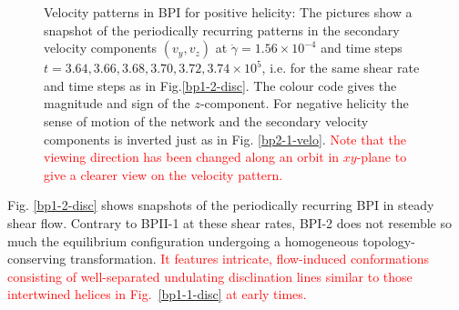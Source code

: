 \documentclass[8.5pt,twoside,twocolumn]{article}
\newcommand{\e}[1]{\times10^{#1}}
\newcommand{\gd}{\dot{\gamma}}
\newcommand{\rev}[1]{{\textcolor{red}{#1}}}
\begin{document}
\begin{figure}[htpb]
\caption{Velocity patterns in BPI for positive helicity: 
The pictures show a snapshot of the periodically recurring patterns in the 
secondary velocity components $(v_y,v_z)$ at $\gd=1.56\e{-4}$ and time steps 
$t=3.64, 3.66,3.68,3.70,3.72,3.74\e{5}$, i.e. for the same shear rate
and time steps as in Fig.\ref{bp1-2-disc}. The colour code gives the magnitude and sign 
of the $z$-component. For negative helicity the sense of motion of the 
network and the secondary velocity components is inverted just as in Fig. \ref{bp2-1-velo}. 
\rev{
Note that the viewing direction has been changed along an orbit in $xy$-plane
 to give a clearer view on the velocity pattern.
}
}
\label{bp1-2-velo}
\end{figure}

Fig. \ref{bp1-2-disc} shows snapshots of the periodically recurring 
BPI in steady shear flow. Contrary to BPII-1 at these shear rates, 
BPI-2 does not resemble so much the equilibrium configuration
undergoing a homogeneous topology-conserving 
transformation. 
\rev{
It features intricate, flow-induced 
conformations consisting of well-separated undulating 
disclination lines similar to those intertwined helices 
in Fig.~\ref{bp1-1-disc} at early times.
}
\end{document}
